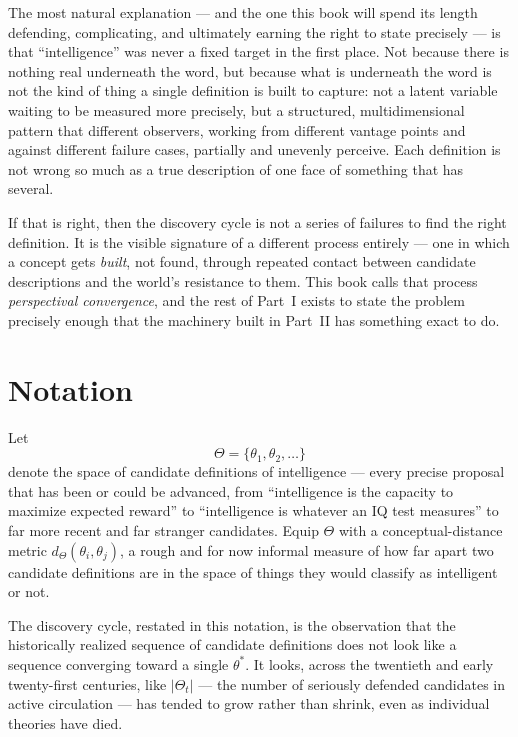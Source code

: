 The most natural explanation --- and the one this book will spend its length defending, complicating, and ultimately earning the right to state precisely --- is that ``intelligence'' was never a fixed target in the first place. Not because there is nothing real underneath the word, but because what is underneath the word is not the kind of thing a single definition is built to capture: not a latent variable waiting to be measured more precisely, but a structured, multidimensional pattern that different observers, working from different vantage points and against different failure cases, partially and unevenly perceive. Each definition is not wrong so much as a true description of one face of something that has several.

If that is right, then the discovery cycle is not a series of failures to find the right definition. It is the visible signature of a different process entirely --- one in which a concept gets \emph{built}, not found, through repeated contact between candidate descriptions and the world's resistance to them. This book calls that process \emph{perspectival convergence}, and the rest of Part~I exists to state the problem precisely enough that the machinery built in Part~II has something exact to do.

\section*{Notation}

Let
\[
\Theta = \{\theta_1, \theta_2, \ldots\}
\]
denote the space of candidate definitions of intelligence --- every precise proposal that has been or could be advanced, from ``intelligence is the capacity to maximize expected reward'' to ``intelligence is whatever an IQ test measures'' to far more recent and far stranger candidates. Equip $\Theta$ with a conceptual-distance metric $d_\Theta(\theta_i,\theta_j)$, a rough and for now informal measure of how far apart two candidate definitions are in the space of things they would classify as intelligent or not.

The discovery cycle, restated in this notation, is the observation that the historically realized sequence of candidate definitions does not look like a sequence converging toward a single $\theta^*$. It looks, across the twentieth and early twenty-first centuries, like $|\Theta_t|$ --- the number of seriously defended candidates in active circulation --- has tended to grow rather than shrink, even as individual theories have died.

